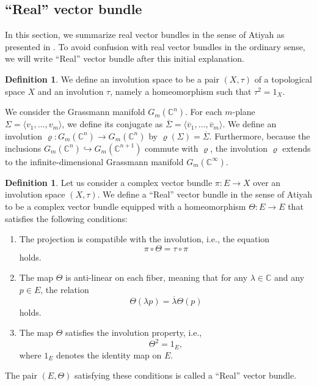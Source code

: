 \documentclass{amsart}
\theoremstyle{definition}
\newtheorem{dfn}[thm]{Definition}
\theoremstyle{remark}
\begin{document}


\subsection{“Real” vector bundle}
\label{subsec:Real vector bundle}

In this section, we summarize real vector bundles in the sense of Atiyah as presented in \cite{Atiyah66}. To avoid confusion with real vector bundles in the ordinary sense, we will write “Real” vector bundle after this initial explanation.


\begin{dfn}
We define an involution space to be a pair $(X, \tau)$ of a topological space $X$ and an involution $\tau$, namely a homeomorphism such that $\tau^2=1_X$.
\end{dfn}

We consider the Grassmann manifold \( G_m(\mathbb{C}^n) \). For each \( m \)-plane \(\Sigma = \langle v_1, \ldots, v_m \rangle\), we define its conjugate as
\(\overline{\Sigma} = \langle \overline{v}_1, \ldots, \overline{v}_m \rangle\). We define an involution \(\varrho: G_m(\mathbb{C}^n) \to G_m(\mathbb{C}^n)\) by \(\varrho(\Sigma) = \overline{\Sigma}\). Furthermore, because the inclusions \( G_m(\mathbb{C}^n) \hookrightarrow G_m(\mathbb{C}^{n+1}) \) commute with \( \varrho \), the involution \(\varrho\) extends to the infinite-dimensional Grassmann manifold \( G_m(\mathbb{C}^\infty). \)

\begin{dfn}
Let us consider a complex vector bundle \(\pi \colon E \to X\) over an involution space \((X, \tau)\). We define a “Real” vector bundle in the sense of Atiyah to be a complex vector bundle equipped with a homeomorphism \(\Theta \colon E \to E\) that satisfies the following conditions:
\begin{enumerate}
    \item The projection is compatible with the involution, i.e., the equation
    \[
    \pi \circ \Theta = \tau \circ \pi
    \]
    holds.
    \item The map \(\Theta\) is anti-linear on each fiber, meaning that for any \(\lambda \in \mathbb{C}\) and any \(p \in E\), the relation
    \[
    \Theta(\lambda p) = \overline{\lambda} \Theta(p)
    \]
    holds.
    \item The map \(\Theta\) satisfies the involution property, i.e., 
    \[
    \Theta^2 = 1_E,
    \]
    where \(1_E\) denotes the identity map on \(E\).
\end{enumerate}
The pair \((E, \Theta)\) satisfying these conditions is called a “Real” vector bundle.
\end{dfn}
\end{document}
